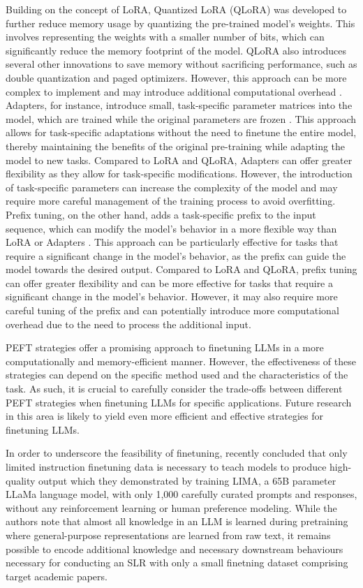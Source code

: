 \documentclass{article}
\begin{document}
Building on the concept of LoRA, Quantized LoRA (QLoRA) was developed to further reduce memory usage by quantizing the pre-trained model's weights. This involves representing the weights with a smaller number of bits, which can significantly reduce the memory footprint of the model. QLoRA also introduces several other innovations to save memory without sacrificing performance, such as double quantization and paged optimizers. However, this approach can be more complex to implement and may introduce additional computational overhead \cite{hu2023llm}. Adapters, for instance, introduce small, task-specific parameter matrices into the model, which are trained while the original parameters are frozen \cite{wang2022adamix}. This approach allows for task-specific adaptations without the need to finetune the entire model, thereby maintaining the benefits of the original pre-training while adapting the model to new tasks. Compared to LoRA and QLoRA, Adapters can offer greater flexibility as they allow for task-specific modifications. However, the introduction of task-specific parameters can increase the complexity of the model and may require more careful management of the training process to avoid overfitting. Prefix tuning, on the other hand, adds a task-specific prefix to the input sequence, which can modify the model's behavior in a more flexible way than LoRA or Adapters \cite{gui2023g}. This approach can be particularly effective for tasks that require a significant change in the model's behavior, as the prefix can guide the model towards the desired output. Compared to LoRA and QLoRA, prefix tuning can offer greater flexibility and can be more effective for tasks that require a significant change in the model's behavior. However, it may also require more careful tuning of the prefix and can potentially introduce more computational overhead due to the need to process the additional input.

PEFT strategies offer a promising approach to finetuning LLMs in a more computationally and memory-efficient manner. However, the effectiveness of these strategies can depend on the specific method used and the characteristics of the task. As such, it is crucial to carefully consider the trade-offs between different PEFT strategies when finetuning LLMs for specific applications. Future research in this area is likely to yield even more efficient and effective strategies for finetuning LLMs.

In order to underscore the feasibility of finetuning, \citet{zhou2023lima} recently concluded that only limited instruction finetuning data is necessary to teach models to produce high-quality output which they demonstrated by training LIMA, a 65B parameter LLaMa language model, with only 1,000 carefully curated prompts and responses, without any reinforcement learning or human preference modeling. While the authors note that almost all knowledge in an LLM is learned during pretraining where general-purpose representations are learned from raw text, it remains possible to encode additional knowledge and necessary downstream behaviours necessary for conducting an SLR with only a small finetning dataset comprising target academic papers.
\end{document}
